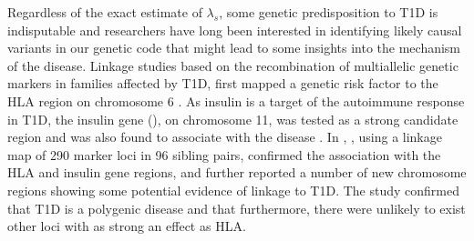 
Regardless of the exact estimate of $\lambda_s$, some genetic predisposition to \gls{T1D} is indisputable
and researchers have long been interested in identifying likely causal variants in our genetic code
that might lead to some insights into the mechanism of the disease.
Linkage studies based on the recombination of multiallelic genetic markers in families affected by \gls{T1D},
first mapped a genetic risk factor to the \gls{HLA} region on chromosome 6 \citep{Singal:1973tg,Cudworth:1974ve,Nerup:1974ui}.
As insulin is a target of the autoimmune response in T1D, the insulin gene (), on chromosome 11, was tested as a strong candidate region
and was also found to associate with the disease \citep{Bell:1984uw,Permutt:1984wt}.
In \citeyear{Davies:1994gu}, \citeauthor{Davies:1994gu}, using a linkage map of 290 marker loci in 96 sibling pairs,
confirmed the association with the HLA and insulin gene regions, and further 
reported a number of new chromosome regions showing some potential evidence of linkage to \gls{T1D}.
The study confirmed that \gls{T1D} is a polygenic disease and that furthermore, there were unlikely to exist other loci with as strong an effect as HLA.

